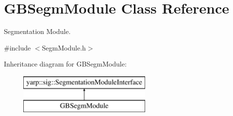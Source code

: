 \section{G\+B\+Segm\+Module Class Reference}
\label{classGBSegmModule}


Segmentation Module.  




{\ttfamily \#include $<$Segm\+Module.\+h$>$}

Inheritance diagram for G\+B\+Segm\+Module\+:\begin{figure}[H]
\begin{center}
\leavevmode
\includegraphics[height=2.000000cm]{classGBSegmModule}
\end{center}
\end{figure}
